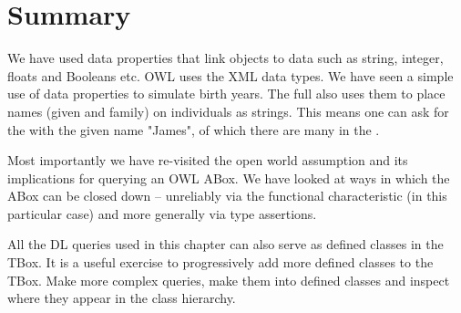 \section{Summary}

We have used data properties that link objects to data such as string, integer, floats and Booleans etc. OWL uses the XML data types. We have seen a simple use of data properties to simulate birth years. The full \fhkb also uses them to place names (given and family) on individuals as strings. This means one can ask for the \person with the given name "James", of which there are many in the \fhkb.

Most importantly we have re-visited the open world assumption and its implications for querying an OWL ABox. We have looked at ways in which the ABox can be closed down -- unreliably via the functional characteristic (in this particular case) and more generally via type assertions.

All the DL queries used in this chapter can also serve as defined classes in the TBox. It is a useful exercise to progressively add more defined classes to the \fhkb TBox. Make more complex queries, make them into defined classes and inspect where they appear in the class hierarchy. 
\\


